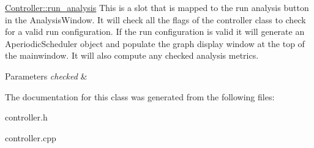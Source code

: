\hyperlink{classController_a7ff7d2d0e8614494020bf5e35dc663a8}{Controller\+::run\+\_\+analysis} This is a slot that is mapped to the run analysis button in the Analysis\+Window. It will check all the flags of the controller class to check for a valid run configuration. If the run configuration is valid it will generate an Aperiodic\+Scheduler object and populate the graph display window at the top of the mainwindow. It will also compute any checked analysis metrics. 


\begin{DoxyParams}{Parameters}
{\em checked} & \\
\hline
\end{DoxyParams}


The documentation for this class was generated from the following files\+:\begin{DoxyCompactItemize}
\item 
controller.\+h\item 
controller.\+cpp\end{DoxyCompactItemize}
